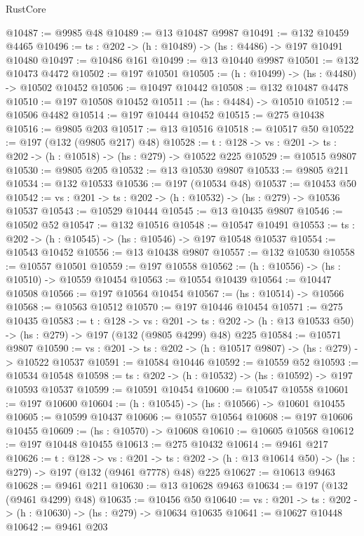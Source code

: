\begin{lexlean}{RustCore}
\begin{coremodule}
@10487 := @9985 @48
@10489 := @13 @10487 @9987
@10491 := @132 @10459 @4465
@10496 := {ts : @202} -> (h : @10489) -> (hs : @4486) -> @197 @10491 @10480
@10497 := @10486 @161
@10499 := @13 @10440 @9987
@10501 := @132 @10473 @4472
@10502 := @197 @10501
@10505 := (h : @10499) -> (hs : @4480) -> @10502 @10452
@10506 := @10497 @10442
@10508 := @132 @10487 @4478
@10510 := @197 @10508 @10452
@10511 := (hs : @4484) -> @10510
@10512 := @10506 @4482
@10514 := @197 @10444 @10452
@10515 := @275 @10438
@10516 := @9805 @203
@10517 := @13 @10516
@10518 := @10517 @50
@10522 := @197 (@132 (@9805 @217) @48)
@10528 := {t : @128} -> {vs : @201} -> {ts : @202} -> (h : @10518) -> (hs : @279) -> @10522 @225
@10529 := @10515 @9807
@10530 := @9805 @205
@10532 := @13 @10530 @9807
@10533 := @9805 @211
@10534 := @132 @10533
@10536 := @197 (@10534 @48)
@10537 := @10453 @50
@10542 := {vs : @201} -> {ts : @202} -> (h : @10532) -> (hs : @279) -> @10536 @10537
@10543 := @10529 @10444
@10545 := @13 @10435 @9807
@10546 := @10502 @52
@10547 := @132 @10516
@10548 := @10547 @10491
@10553 := {ts : @202} -> (h : @10545) -> (hs : @10546) -> @197 @10548 @10537
@10554 := @10543 @10452
@10556 := @13 @10438 @9807
@10557 := @132 @10530
@10558 := @10557 @10501
@10559 := @197 @10558
@10562 := (h : @10556) -> (hs : @10510) -> @10559 @10454
@10563 := @10554 @10439
@10564 := @10447 @10508
@10566 := @197 @10564 @10454
@10567 := (hs : @10514) -> @10566
@10568 := @10563 @10512
@10570 := @197 @10446 @10454
@10571 := @275 @10435
@10583 := {t : @128} ->
  {vs : @201} ->
  {ts : @202} -> (h : @13 @10533 @50) -> (hs : @279) -> @197 (@132 (@9805 @4299) @48) @225
@10584 := @10571 @9807
@10590 := {vs : @201} -> {ts : @202} -> (h : @10517 @9807) -> (hs : @279) -> @10522 @10537
@10591 := @10584 @10446
@10592 := @10559 @52
@10593 := @10534 @10548
@10598 := {ts : @202} -> (h : @10532) -> (hs : @10592) -> @197 @10593 @10537
@10599 := @10591 @10454
@10600 := @10547 @10558
@10601 := @197 @10600
@10604 := (h : @10545) -> (hs : @10566) -> @10601 @10455
@10605 := @10599 @10437
@10606 := @10557 @10564
@10608 := @197 @10606 @10455
@10609 := (hs : @10570) -> @10608
@10610 := @10605 @10568
@10612 := @197 @10448 @10455
@10613 := @275 @10432
@10614 := @9461 @217
@10626 := {t : @128} ->
  {vs : @201} ->
  {ts : @202} -> (h : @13 @10614 @50) -> (hs : @279) -> @197 (@132 (@9461 @7778) @48) @225
@10627 := @10613 @9463
@10628 := @9461 @211
@10630 := @13 @10628 @9463
@10634 := @197 (@132 (@9461 @4299) @48)
@10635 := @10456 @50
@10640 := {vs : @201} -> {ts : @202} -> (h : @10630) -> (hs : @279) -> @10634 @10635
@10641 := @10627 @10448
@10642 := @9461 @203

\end{coremodule}
\end{lexlean}
